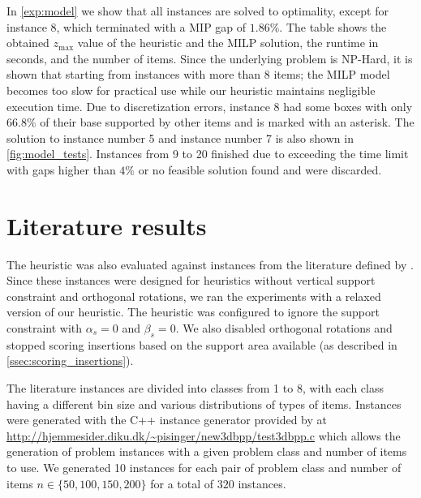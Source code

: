 In \cref{exp:model} we show that all instances are solved to optimality, except for instance 8, which terminated with a MIP gap of $1.86\%$.
The table shows the obtained $z_{\text{max}}$ value of the heuristic and the MILP solution, the runtime in seconds, and the number of items.
Since the underlying problem is NP-Hard, it is shown that starting from instances with more than 8 items; the MILP model becomes too slow for practical use while our heuristic maintains negligible execution time.
Due to discretization errors, instance 8 had some boxes with only $66.8\%$ of their base supported by other items and is marked with an asterisk.
The solution to instance number 5 and instance number 7 is also shown in \cref{fig:model_tests}.
Instances from 9 to 20 finished due to exceeding the time limit with gaps higher than $4\%$ or no feasible solution found and were discarded.
\label{exp:model_tests}



\clearpage
\section{Literature results}
The heuristic was also evaluated against instances from the literature defined by \cite{martello2000three}.
Since these instances were designed for heuristics without vertical support constraint and orthogonal rotations, we ran the experiments with a relaxed version of our heuristic.
The heuristic was configured to ignore the support constraint with $\alpha_s = 0$ and $\beta_s = 0$. We also disabled orthogonal rotations and stopped scoring insertions based on the support area available (as described in \cref{ssec:scoring_insertions}).

\label{def:class1_instances}
The literature instances are divided into classes from 1 to 8, with each class having a different bin size and various distributions of types of items.
Instances were generated with the C++ instance generator provided by \cite{martello2000three} at \url{http://hjemmesider.diku.dk/~pisinger/new3dbpp/test3dbpp.c} which allows the generation of problem instances with a given problem class and number of items to use.
We generated 10 instances for each pair of problem class and number of items $n \in \{50, 100, 150, 200\}$ for a total of $320$ instances.

